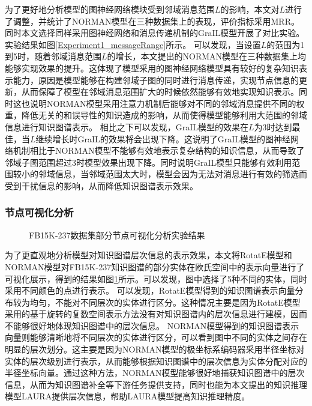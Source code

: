 \documentclass[algorithmlist, AutoFakeBold, AutoFakeSlant, figurelist, tablelist, nomlist, engineering, openany]{seuthesix} %
\begin{document}
为了更好地分析模型的图神经网络模块受到邻域消息范围$L$的影响，本文对$L$进行了调整，并统计了NORMAN模型在三种数据集上的表现，评价指标采用MRR。
同时本文选择同样采用图神经网络和消息传递机制的GraIL模型开展了对比实验。实验结果如图\ref{Experiment1_messageRange}所示。
可以发现，当设置$L$的范围为1到5时，随着邻域消息范围$L$的增长，本文提出的NORMAN模型在三种数据集上均能够实现效果的提升。这体现了模型采用的图神经网络模型具有较好的复杂知识表示能力，原因是模型能够在构建邻域子图的同时进行消息传递，实现节点信息的更新，从而保障了模型在邻域消息范围扩大的时候依然能够有效地实现知识表示。同时这也说明NORMAN模型采用注意力机制后能够对不同的邻域消息提供不同的权重，降低无关的和误导性的知识造成的影响，从而使得模型能够利用大范围的邻域信息进行知识图谱表示。
相比之下可以发现，GraIL模型的效果在$L$为3时达到最佳，当$L$继续增长时GraIL的效果将会出现下降。这说明了GraIL模型的图神经网络机制相比于NORMAN模型不能够有效地表示复杂结构的知识信息，从而导致了邻域子图范围超过3时模型效果出现下降。同时说明GraIL模型只能够有效利用范围较小的邻域信息，当邻域范围太大时，模型会因为无法对消息进行有效的筛选而受到干扰信息的影响，从而降低知识图谱表示效果。

\subsubsection{节点可视化分析}
\begin{figure}[t]
  \centering
  \caption{FB15K-237数据集部分节点可视化分析实验结果}
  \label{Experiment1_figures}
\end{figure}

为了更直观地分析模型对知识图谱层次信息的表示效果，本文将RotatE模型和NORMAN模型对FB15K-237知识图谱的部分实体在欧氏空间中的表示向量进行了可视化展示，得到的结果如图\ref{Experiment1_figures}所示。可以发现，图中选择了5种不同的实体，同时采用不同颜色的点进行表示。
可以发现，RotatE模型得到的知识图谱表示向量分布较为均匀，不能对不同层次的实体进行区分。这种情况主要是因为RotatE模型采用的基于旋转的复数空间表示方法没有对知识图谱内的层次信息进行建模，因而不能够很好地体现知识图谱中的层次信息。
NORMAN模型得到的知识图谱表示向量则能够清晰地将不同层次的实体进行区分，可以看到图中不同的实体之间存在明显的层次划分。这主要是因为NORMAN模型的极坐标系编码器采用半径坐标对实体的层次级别进行表示，从而能够根据知识图谱中的层次信息为实体分配对应的半径坐标向量。通过这种方法，NORMAN模型能够很好地捕获知识图谱中的层次信息，从而为知识图谱补全等下游任务提供支持，同时也能为本文提出的知识推理模型LAURA提供层次信息，帮助LAURA模型提高知识推理精度。
\end{document}
